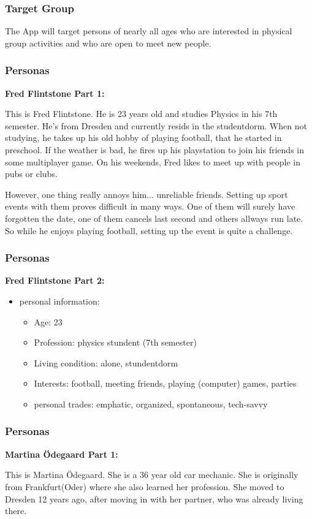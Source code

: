 \documentclass[aspectratio=169]{beamer}
\begin{document}
\begin{frame}   
\frametitle{Target Group}
The App will target persons of nearly all ages who are interested in physical group activities and who are open to meet new people. 
\end{frame}

\begin{frame}   
	\frametitle{Personas}{\textbf{Fred Flintstone Part 1:}}

	This is Fred Flintstone. He is 23 years old and studies Physics in his 7th semester. 
He's from Dresden and currently resids in the studentdorm. 
When not studying, he takes up his old hobby of playing football, that he started in preschool. If the weather is bad, he fires up his playstation to join his friends in some multiplayer game.
On his weekends, Fred likes to meet up with people in pubs or clubs.

However, one thing really annoys him... unreliable friends. Setting up sport events with them proves difficult in many ways.
One of them will surely have forgotten the date, one of them cancels last second and others allways run late.
So while he enjoys playing football, setting up the event is quite a challenge.
\end{frame}

\begin{frame}   
	\frametitle{Personas}{\textbf{Fred Flintstone Part 2:}}

\begin{itemize}
	\item personal information:
	\begin{itemize}
		\item Age: 23
		\item Profession: physics stundent (7th semester)
		\item Living condition: alone, stundentdorm
		\item Interests: football, meeting friends, playing (computer) games, parties
		\item personal trades: emphatic, organized, spontaneous, tech-savvy
\end{itemize}
\end{itemize}

\end{frame}

\begin{frame}   
	\frametitle{Personas}{\textbf{Martina Ödegaard Part 1:}}

	This is Martina Ödegaard. She is a 36 year old car mechanic. She is originally from Frankfurt(Oder) where she also learned her profession. She moved to Dresden 12 years ago, after moving in with her partner, who was already living there. 
\end{frame}
\end{document}
